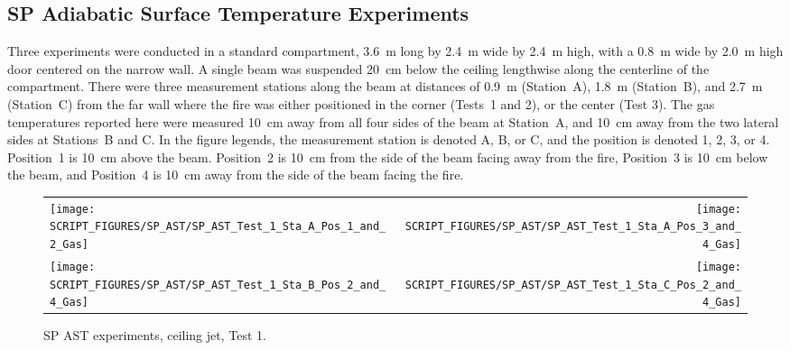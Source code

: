 \clearpage


\subsection{SP Adiabatic Surface Temperature Experiments}

Three experiments were conducted in a standard compartment, 3.6~m long by 2.4~m wide by 2.4~m high, with a 0.8~m wide by 2.0~m high door centered on the narrow wall. A single beam was suspended 20~cm below the ceiling lengthwise along the centerline of the compartment. There were three measurement stations along the beam at distances of 0.9~m (Station~A), 1.8~m (Station~B), and 2.7~m (Station~C) from the far wall where the fire was either positioned in the corner (Tests~1 and 2), or the center (Test 3). The gas temperatures reported here were measured 10~cm away from all four sides of the beam at Station~A, and 10~cm away from the two lateral sides at Stations~B and C. In the figure legends, the measurement station is denoted A, B, or C, and the position is denoted 1, 2, 3, or 4. Position~1 is 10~cm above the beam. Position~2 is 10~cm from the side of the beam facing away from the fire, Position~3 is 10~cm below the beam, and Position~4 is 10~cm away from the side of the beam facing the fire.

\begin{figure}[!h]
\begin{tabular*}{\textwidth}{l@{\extracolsep{\fill}}r}
\texttt{[image: SCRIPT\_FIGURES/SP\_AST/SP\_AST\_Test\_1\_Sta\_A\_Pos\_1\_and\_2\_Gas]} &
\texttt{[image: SCRIPT\_FIGURES/SP\_AST/SP\_AST\_Test\_1\_Sta\_A\_Pos\_3\_and\_4\_Gas]} \\
\texttt{[image: SCRIPT\_FIGURES/SP\_AST/SP\_AST\_Test\_1\_Sta\_B\_Pos\_2\_and\_4\_Gas]} &
\texttt{[image: SCRIPT\_FIGURES/SP\_AST/SP\_AST\_Test\_1\_Sta\_C\_Pos\_2\_and\_4\_Gas]}
\end{tabular*}
\caption[SP AST experiments, ceiling jet, Test 1]{SP AST experiments, ceiling jet, Test 1.}
\label{SP_Test_1_Gas}
\end{figure}

\newpage


